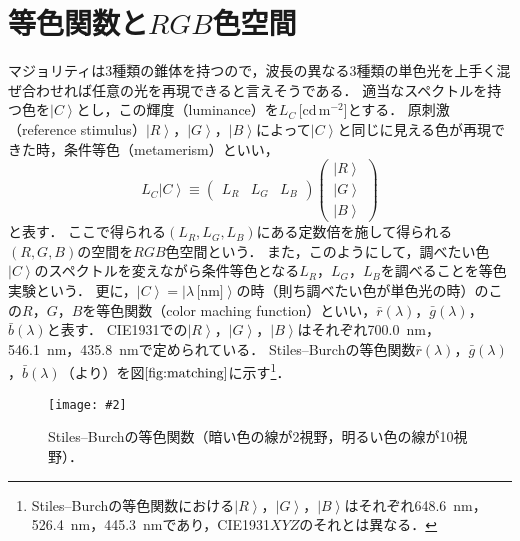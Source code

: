 \documentclass[uplatex,paper=a4,fontsize=4.0truemm,jafontsize=4.0truemm,head_space=30.0truemm,foot_space=30.0truemm,baselineskip=8.0truemm,line_length=40zw,gutter=25.0truemm,oneside,openany,fleqn,hanging_panctuation,open_bracket_pos=nibu_tentsuki,dvipdfmx,jis2004,book,titlepage]{jlreq}
\theoremstyle{mystyle}
\newcommand{\captiondot}[1]{\caption{#1．}}
\newcommand{\figureinput}[4]{\begin{figure}[btp]\centering\texttt{[image: \#2]}\captiondot{#3}\label{fig:#4}\end{figure}}
\newcommand{\mathdisplaystyle}[1]{\(\displaystyle{#1}\)}
\newcommand{\Reference}[1]{\mathdisplaystyle{\ref{#1}}}
\newcommand{\negativevalue}[1]{{-#1}}
\newcommand{\parentheses}[1]{\left(#1\right)}
\newcommand{\Diracket}[1]{\left\lvert#1\right\rangle}
\newcommand{\easymatrix}[1]{\mathord{\begin{pmatrix}#1\end{pmatrix}}}
\begin{document}
		\section{等色関数と\mathdisplaystyle{RGB}色空間}
			マジョリティは3種類の錐体を持つので，波長の異なる3種類の単色光を上手く混ぜ合わせれば任意の光を再現できると言えそうである．
			適当なスペクトルを持つ色を\mathdisplaystyle{\Diracket{C}}とし，この輝度（luminance）を\mathdisplaystyle{L_C}\,[cd\,\mathdisplaystyle{\textrm{m}^\negativevalue{2}}]とする．
			原刺激（reference stimulus）\mathdisplaystyle{\Diracket{R}}，\mathdisplaystyle{\Diracket{G}}，\mathdisplaystyle{\Diracket{B}}によって\mathdisplaystyle{\Diracket{C}}と同じに見える色が再現できた時，条件等色（metamerism）といい，
			\begin{equation*}
				L_C\Diracket{C}\equiv \easymatrix{L_R & L_G & L_B}\easymatrix{\Diracket{R} \\ \Diracket{G} \\ \Diracket{B}}
			\end{equation*}
			と表す．
			ここで得られる\mathdisplaystyle{\parentheses{L_R,L_G,L_B}}にある定数倍を施して得られる\mathdisplaystyle{\parentheses{R,G,B}}の空間を\mathdisplaystyle{RGB}色空間という．
			また，このようにして，調べたい色\mathdisplaystyle{\Diracket{C}}のスペクトルを変えながら条件等色となる\mathdisplaystyle{L_R}，\mathdisplaystyle{L_G}，\mathdisplaystyle{L_B}を調べることを等色実験という．
			更に，\mathdisplaystyle{\Diracket{C}=\Diracket{\lambda\,\textrm{[nm]}}}の時（則ち調べたい色が単色光の時）のこの\mathdisplaystyle{R}，\mathdisplaystyle{G}，\mathdisplaystyle{B}を等色関数（color maching function）といい，\mathdisplaystyle{\bar{r}\parentheses{\lambda}}，\mathdisplaystyle{\bar{g}\parentheses{\lambda}}，\mathdisplaystyle{\bar{b}\parentheses{\lambda}}と表す．
			CIE1931での\mathdisplaystyle{\Diracket{R}}，\mathdisplaystyle{\Diracket{G}}，\mathdisplaystyle{\Diracket{B}}はそれぞれ\SI{700.0}{nm}，\SI{546.1}{nm}，\SI{435.8}{nm}で定められている．
			Stiles--Burchの等色関数\mathdisplaystyle{\bar{r}\parentheses{\lambda}}，\mathdisplaystyle{\bar{g}\parentheses{\lambda}}，\mathdisplaystyle{\bar{b}\parentheses{\lambda}}（\cite{Stiles1955,Stiles1959}より）を図\Reference{fig:matching}に示す\footnote{Stiles--Burchの等色関数における\mathdisplaystyle{\Diracket{R}}，\mathdisplaystyle{\Diracket{G}}，\mathdisplaystyle{\Diracket{B}}はそれぞれ\SI{648.6}{nm}，\SI{526.4}{nm}，\SI{445.3}{nm}であり，CIE1931\mathdisplaystyle{XYZ}のそれとは異なる．}．
			\figureinput{width=\linewidth}{D:/a/figs/RGBcmf.png}{Stiles--Burchの等色関数（暗い色の線が2\textdegree 視野，明るい色の線が10\textdegree 視野）}{matching}
\end{document}
